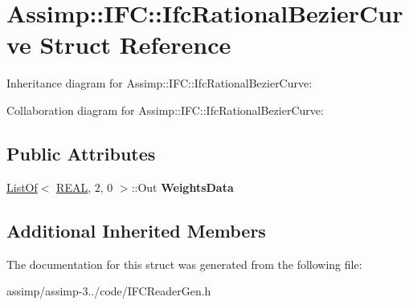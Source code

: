 \hypertarget{struct_assimp_1_1_i_f_c_1_1_ifc_rational_bezier_curve}{\section{Assimp\+:\+:I\+F\+C\+:\+:Ifc\+Rational\+Bezier\+Curve Struct Reference}
\label{struct_assimp_1_1_i_f_c_1_1_ifc_rational_bezier_curve}
}


Inheritance diagram for Assimp\+:\+:I\+F\+C\+:\+:Ifc\+Rational\+Bezier\+Curve\+:


Collaboration diagram for Assimp\+:\+:I\+F\+C\+:\+:Ifc\+Rational\+Bezier\+Curve\+:
\subsection*{Public Attributes}
\begin{DoxyCompactItemize}
\item 
\hypertarget{struct_assimp_1_1_i_f_c_1_1_ifc_rational_bezier_curve_a1561693144a8322296f6d1a0f8415d37}{\hyperlink{struct_assimp_1_1_s_t_e_p_1_1_list_of}{List\+Of}$<$ \hyperlink{class_assimp_1_1_s_t_e_p_1_1_e_x_p_r_e_s_s_1_1_primitive_data_type}{R\+E\+A\+L}, 2, 0 $>$\+::Out {\bfseries Weights\+Data}}\label{struct_assimp_1_1_i_f_c_1_1_ifc_rational_bezier_curve_a1561693144a8322296f6d1a0f8415d37}

\end{DoxyCompactItemize}
\subsection*{Additional Inherited Members}


The documentation for this struct was generated from the following file\+:\begin{DoxyCompactItemize}
\item 
assimp/assimp-\/3../code/I\+F\+C\+Reader\+Gen.\+h\end{DoxyCompactItemize}
